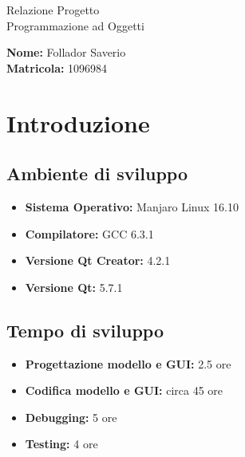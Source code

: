 \documentclass[a4paper,10pt] {article}
\begin{document}
\begin{center}

\begin{Huge} Relazione Progetto \\ Programmazione ad Oggetti \end{Huge}

\vfill

\begin{Large} \textbf{Nome:} Follador Saverio \\ \textbf{Matricola:} 1096984 
\end{Large}

\end{center}

\newpage

\tableofcontents

\newpage

\section{Introduzione}

\subsection{Ambiente di sviluppo}
\begin{itemize}
	\item \textbf{Sistema Operativo:} Manjaro Linux 16.10
	\item \textbf{Compilatore:} GCC 6.3.1
	\item \textbf{Versione Qt Creator:} 4.2.1
	\item \textbf{Versione Qt:} 5.7.1
\end{itemize}

\subsection{Tempo di sviluppo}
\begin{itemize}
	\item \textbf{Progettazione modello e GUI:} 2.5 ore
	\item \textbf{Codifica modello e GUI:} circa 45 ore
	\item \textbf{Debugging:} 5 ore
	\item \textbf{Testing:} 4 ore
\end{itemize}
\end{document}
